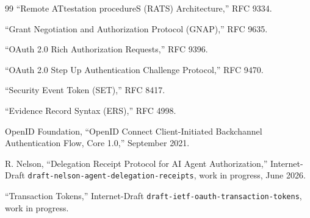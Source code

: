 \documentclass[11pt]{article}
\newcommand{\code}[1]{\texttt{#1}}
\begin{document}
\begin{thebibliography}{99}
 ``Remote ATtestation procedureS (RATS) Architecture,'' RFC 9334.

 ``Grant Negotiation and Authorization Protocol (GNAP),'' RFC 9635.

 ``OAuth 2.0 Rich Authorization Requests,'' RFC 9396.

 ``OAuth 2.0 Step Up Authentication Challenge Protocol,'' RFC 9470.

 ``Security Event Token (SET),'' RFC 8417.

 ``Evidence Record Syntax (ERS),'' RFC 4998.

 OpenID Foundation, ``OpenID Connect Client-Initiated Backchannel
Authentication Flow, Core 1.0,'' September 2021.

 R. Nelson, ``Delegation Receipt Protocol for AI Agent
Authorization,'' Internet-Draft \code{draft-nelson-agent-delegation-receipts}, work
in progress, June 2026.

 ``Transaction Tokens,'' Internet-Draft
\code{draft-ietf-oauth-transaction-tokens}, work in progress.

\end{thebibliography}
\end{document}
